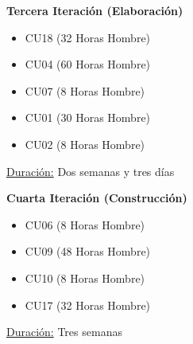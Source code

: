 \noindent \textbf{Tercera Iteración (Elaboración)}
\begin{itemize}
  \item CU18 (32 Horas Hombre)
  \item CU04 (60 Horas Hombre)
  \item CU07 (8 Horas Hombre)
  \item CU01 (30 Horas Hombre)
  \item CU02 (8 Horas Hombre)
\end{itemize}
\underline{Duración:} Dos semanas y tres días
\vspace{1.5em}

\noindent \textbf{Cuarta Iteración (Construcción)}
\begin{itemize}
  \item CU06 (8 Horas Hombre)
  \item CU09 (48 Horas Hombre)
  \item CU10 (8 Horas Hombre)
  \item CU17 (32 Horas Hombre)
\end{itemize}
\underline{Duración:} Tres semanas